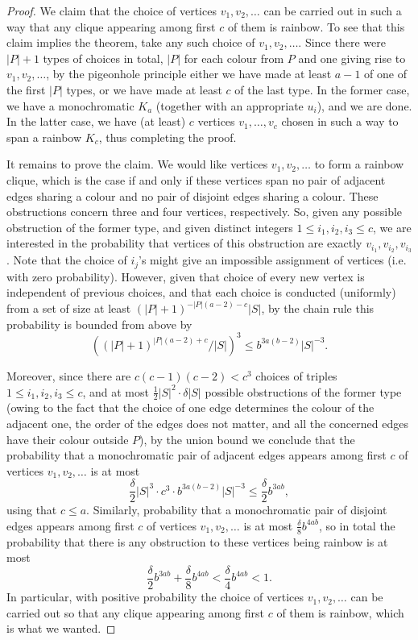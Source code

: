 \documentclass[10pt,a4paper]{article}
\theoremstyle{plain}
\theoremstyle{definition}
\begin{document}
\begin{proof}
    We claim that the choice of vertices $v_1,v_2,\dots$ can be carried out in such a way that any clique appearing among first $c$ of them is rainbow. To see that this claim implies the theorem, take any such choice of $v_1,v_2,\dots$. Since there were $|P|+1$ types of choices in total, $|P|$ for each colour from $P$ and one giving rise to $v_1,v_2,\dots$, by the pigeonhole principle either we have made at least $a-1$ of one of the first $|P|$ types, or we have made at least $c$ of the last type. In the former case, we have a monochromatic $K_a$ (together with an appropriate $u_i$), and we are done. In the latter case, we have (at least) $c$ vertices $v_1,\dots,v_c$ chosen in such a way to span a rainbow $K_c$, thus completing the proof.

    It remains to prove the claim. We would like vertices $v_1,v_2,\dots$ to form a rainbow clique, which is the case if and only if these vertices span no pair of adjacent edges sharing a colour and no pair of disjoint edges sharing a colour. These obstructions concern three and four vertices, respectively. So, given any possible obstruction of the former type, and given distinct integers $1\le i_1,i_2,i_3\le c$, we are interested in the probability that vertices of this obstruction are exactly $v_{i_1},v_{i_2},v_{i_3}$. Note that the choice of $i_j$'s might give an impossible assignment of vertices (i.e. with zero probability). However, given that choice of every new vertex is independent of previous choices, and that each choice is conducted (uniformly) from a set of size at least $(|P|+1)^{-|P|(a-2)-c}|S|$, by the chain rule this probability is bounded from above by
    $$\left( (|P|+1)^{|P|(a-2)+c}/|S| \right)^3\le b^{3a(b-2)}|S|^{-3}.$$

    Moreover, since there are $c(c-1)(c-2)<c^3$ choices of triples $1\le i_1,i_2,i_3\le c$, and at most $\frac{1}{2}|S|^2\cdot \delta|S|$ possible obstructions of the former type (owing to the fact that the choice of one edge determines the colour of the adjacent one, the order of the edges does not matter, and all the concerned edges have their colour outside $P$), by the union bound we conclude that the probability that a monochromatic pair of adjacent edges appears among first $c$ of vertices $v_1,v_2,\dots$ is at most
    $$\frac{\delta}{2}|S|^3\cdot c^3\cdot b^{3a(b-2)}|S|^{-3}\le \frac{\delta}{2}b^{3ab},$$
    using that $c\le a$. Similarly, probability that a monochromatic pair of disjoint edges appears among first $c$ of vertices $v_1,v_2,\dots$ is at most $\frac{\delta}{8}b^{4ab}$, so in total the probability that there is any obstruction to these vertices being rainbow is at most
    $$\frac{\delta}{2}b^{3ab}+\frac{\delta}{8}b^{4ab}<\frac{\delta}{4}b^{4ab}<1.$$
    In particular, with positive probability the choice of vertices $v_1,v_2,\dots$ can be carried out so that any clique appearing among first $c$ of them is rainbow, which is what we wanted.
\end{proof}
\end{document}
